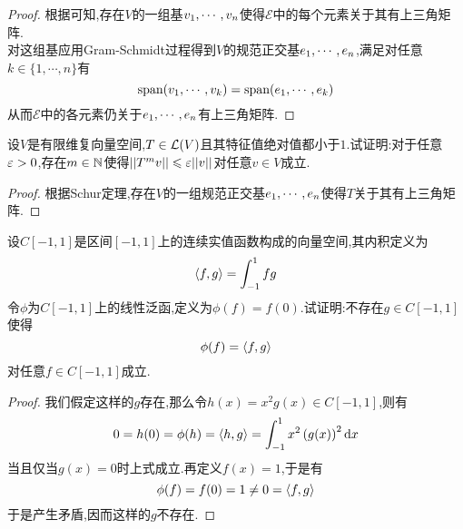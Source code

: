\documentclass{ctexart}
\begin{document}
\begin{proof}
    根据可知,存在$V$的一组基${v}_1,\cdots,{v}_{n}$使得$\mathcal{E}$中的每个元素关于其有上三角矩阵.\\
    对这组基应用Gram-Schmidt过程得到$V$的规范正交基${e}_1,\cdots,{e}_{n}$,满足对任意$k\in\{1,\cdots,n\}$有
    \[\text{span}({v}_1,\cdots,{v}_{k})=\text{span}({e}_1,\cdots,{e}_{k})\]
    从而$\mathcal{E}$中的各元素仍关于${e}_1,\cdots,{e}_{n}$有上三角矩阵.
\end{proof}
\begin{problem}[21.]
    设$V$是有限维复向量空间,$T\in\mathcal{L}(V)$且其特征值绝对值都小于$1$.试证明:对于任意$\varepsilon>0$,存在$m\in\mathbb{N}$使得$||T^mv||\leqslant\varepsilon||v||$对任意$v\in V$成立.
\end{problem}
\begin{proof}
    根据Schur定理,存在$V$的一组规范正交基${e}_1,\cdots,{e}_{n}$使得$T$关于其有上三角矩阵.
\end{proof}
\begin{problem}[22.]
    设$C[-1,1]$是区间$[-1,1]$上的连续实值函数构成的向量空间,其内积定义为
    \[\left\langle{f},{g}\right\rangle=\displaystyle\int_{-1}^{1}fg\]
    令$\phi$为$C[-1,1]$上的线性泛函,定义为$\phi(f)=f(0)$.试证明:不存在$g\in C[-1,1]$使得
    \[\phi(f)=\left\langle{f},{g}\right\rangle\]
    对任意$f\in C[-1,1]$成立.
\end{problem}
\begin{proof}
    我们假定这样的$g$存在,那么令$h(x)=x^2g(x)\in C[-1,1]$,则有
    \[0=h(0)=\phi(h)=\left\langle{h},{g}\right\rangle=\int_{-1}^{1}x^2\left(g(x)\right)^2\mathrm{d} x\]
    当且仅当$g(x)=0$时上式成立.再定义$f(x)=1$,于是有
    \[\phi(f)=f(0)=1\neq0=\left\langle{f},{g}\right\rangle\]
    于是产生矛盾,因而这样的$g$不存在.
\end{proof}
\end{document}
